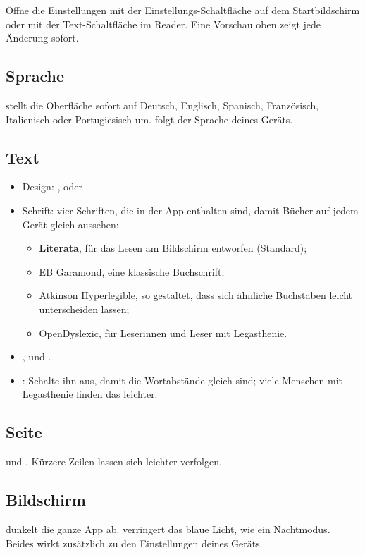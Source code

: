\documentclass[11pt]{article}
\begin{document}
Öffne die Einstellungen mit der Einstellungs-Schaltfläche auf dem Startbildschirm oder mit der
Text-Schaltfläche im Reader. Eine Vorschau oben zeigt jede Änderung sofort.


\subsection{Sprache}
 stellt die Oberfläche sofort auf Deutsch, Englisch, Spanisch, Französisch,
Italienisch oder Portugiesisch um.  folgt der Sprache deines Geräts.

\subsection{Text}
\begin{itemize}
  \item Design: ,  oder .
  \item Schrift: vier Schriften, die in der App enthalten sind, damit Bücher auf jedem Gerät
        gleich aussehen:
  \begin{itemize}
    \item \textbf{Literata}, für das Lesen am Bildschirm entworfen (Standard);
    \item {\garamondfont EB Garamond}, eine klassische Buchschrift;
    \item {\sffamily Atkinson Hyperlegible}, so gestaltet, dass sich ähnliche Buchstaben leicht
          unterscheiden lassen;
    \item {\dyslexicfont OpenDyslexic}, für Leserinnen und Leser mit Legasthenie.
  \end{itemize}
  \item {},  und .
  \item {}: Schalte ihn aus, damit die Wortabstände gleich sind; viele Menschen mit
        Legasthenie finden das leichter.
\end{itemize}

\subsection{Seite}
 und . Kürzere Zeilen lassen sich leichter verfolgen.

\subsection{Bildschirm}
 dunkelt die ganze App ab.  verringert das blaue Licht, wie ein
Nachtmodus. Beides wirkt zusätzlich zu den Einstellungen deines Geräts.
\end{document}

